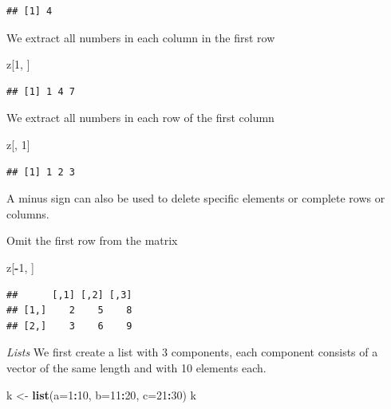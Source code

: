 \documentclass[]{book}
\newenvironment{Shaded}{\begin{snugshade}}{\end{snugshade}}
\newcommand{\KeywordTok}[1]{\textcolor[rgb]{0.13,0.29,0.53}{\textbf{#1}}}
\newcommand{\DataTypeTok}[1]{\textcolor[rgb]{0.13,0.29,0.53}{#1}}
\newcommand{\DecValTok}[1]{\textcolor[rgb]{0.00,0.00,0.81}{#1}}
\newcommand{\StringTok}[1]{\textcolor[rgb]{0.31,0.60,0.02}{#1}}
\newcommand{\OperatorTok}[1]{\textcolor[rgb]{0.81,0.36,0.00}{\textbf{#1}}}
\newcommand{\NormalTok}[1]{#1}
\theoremstyle{definition}
\theoremstyle{definition}
\theoremstyle{definition}
\theoremstyle{remark}
\begin{document}
\begin{verbatim}
## [1] 4
\end{verbatim}

We extract all numbers in each column in the first row

\begin{Shaded}
\begin{Highlighting}[]
\NormalTok{z[}\DecValTok{1}\NormalTok{, ]}
\end{Highlighting}
\end{Shaded}

\begin{verbatim}
## [1] 1 4 7
\end{verbatim}

We extract all numbers in each row of the first column

\begin{Shaded}
\begin{Highlighting}[]
\NormalTok{z[, }\DecValTok{1}\NormalTok{]}
\end{Highlighting}
\end{Shaded}

\begin{verbatim}
## [1] 1 2 3
\end{verbatim}

A minus sign can also be used to delete specific elements or complete
rows or columns.

Omit the first row from the matrix

\begin{Shaded}
\begin{Highlighting}[]
\NormalTok{z[}\OperatorTok{-}\DecValTok{1}\NormalTok{, ]}
\end{Highlighting}
\end{Shaded}

\begin{verbatim}
##      [,1] [,2] [,3]
## [1,]    2    5    8
## [2,]    3    6    9
\end{verbatim}

\emph{Lists} We first create a list with 3 components, each component
consists of a vector of the same length and with 10 elements each.

\begin{Shaded}
\begin{Highlighting}[]
\NormalTok{k <-}\StringTok{ }\KeywordTok{list}\NormalTok{(}\DataTypeTok{a=}\DecValTok{1}\OperatorTok{:}\DecValTok{10}\NormalTok{, }\DataTypeTok{b=}\DecValTok{11}\OperatorTok{:}\DecValTok{20}\NormalTok{, }\DataTypeTok{c=}\DecValTok{21}\OperatorTok{:}\DecValTok{30}\NormalTok{)}
\NormalTok{k}
\end{Highlighting}
\end{Shaded}
\end{document}
